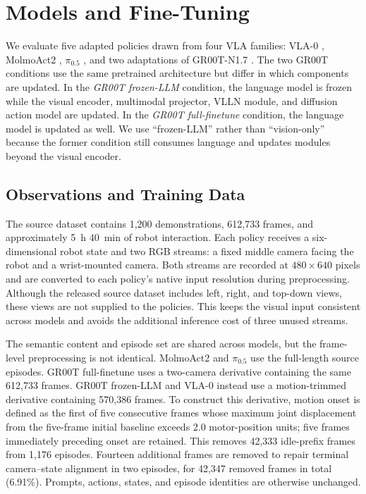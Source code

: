 
\section{Models and Fine-Tuning}
\label{sec:models_and_finetuning}

We evaluate five adapted policies drawn from four VLA families: VLA-0 \cite{goyal2025vla0}, MolmoAct2 \cite{fang2026molmoact2}, $\pi_{0.5}$ \cite{black2025pi05}, and two adaptations of GR00T-N1.7 \cite{grootn17}. The two GR00T conditions use the same pretrained architecture but differ in which components are updated. In the \emph{GR00T frozen-LLM} condition, the language model is frozen while the visual encoder, multimodal projector, VLLN module, and diffusion action model are updated. In the \emph{GR00T full-finetune} condition, the language model is updated as well. We use ``frozen-LLM'' rather than ``vision-only'' because the former condition still consumes language and updates modules beyond the visual encoder.

\subsection{Observations and Training Data}

The source dataset contains 1,200 demonstrations, 612,733 frames, and approximately 5~h 40~min of robot interaction. Each policy receives a six-dimensional robot state and two RGB streams: a fixed middle camera facing the robot and a wrist-mounted camera. Both streams are recorded at $480\times640$ pixels and are converted to each policy's native input resolution during preprocessing. Although the released source dataset includes left, right, and top-down views, these views are not supplied to the policies. This keeps the visual input consistent across models and avoids the additional inference cost of three unused streams.

The semantic content and episode set are shared across models, but the frame-level preprocessing is not identical. MolmoAct2 and $\pi_{0.5}$ use the full-length source episodes. GR00T full-finetune uses a two-camera derivative containing the same 612,733 frames. GR00T frozen-LLM and VLA-0 instead use a motion-trimmed derivative containing 570,386 frames. To construct this derivative, motion onset is defined as the first of five consecutive frames whose maximum joint displacement from the five-frame initial baseline exceeds 2.0 motor-position units; five frames immediately preceding onset are retained. This removes 42,333 idle-prefix frames from 1,176 episodes. Fourteen additional frames are removed to repair terminal camera--state alignment in two episodes, for 42,347 removed frames in total (6.91\%). Prompts, actions, states, and episode identities are otherwise unchanged.

